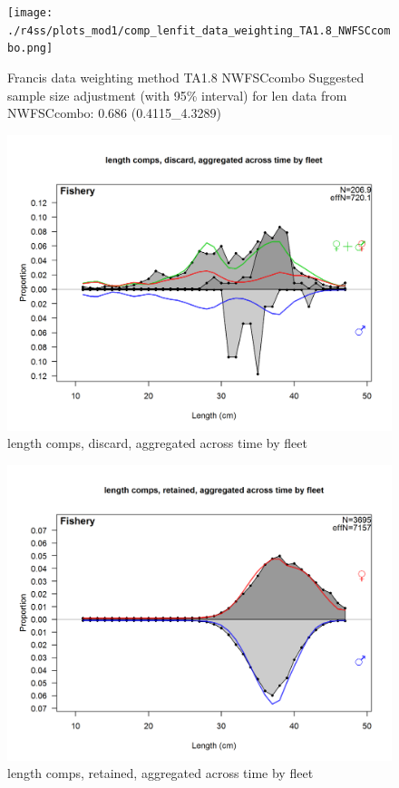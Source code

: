 \documentclass[12pt,]{article}
\begin{document}
\begin{figure}
\centering
\texttt{[image: ./r4ss/plots\_mod1/comp\_lenfit\_data\_weighting\_TA1.8\_NWFSCcombo.png]}
\caption{Francis data weighting method TA1.8 NWFSCcombo Suggested sample
size adjustment (with 95\% interval) for len data from NWFSCcombo: 0.686
(0.4115\_4.3289)
\label{fig:mod1_33_comp_lenfit_data_weighting_TA1.8_NWFSCcombo}}
\end{figure}

\begin{figure}
\centering
\includegraphics{./r4ss/plots_mod1/comp_lenfit_mkt1_aggregated_across_time.png}
\caption{length comps, discard, aggregated across time by fleet
\label{fig:mod1_34_comp_lenfit_mkt1_aggregated_across_time}}
\end{figure}

\begin{figure}
\centering
\includegraphics{./r4ss/plots_mod1/comp_lenfit_mkt2_aggregated_across_time.png}
\caption{length comps, retained, aggregated across time by fleet
\label{fig:mod1_35_comp_lenfit_mkt2_aggregated_across_time}}
\end{figure}
\end{document}

